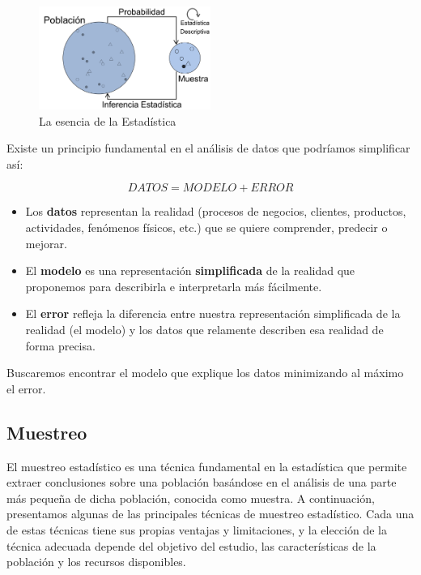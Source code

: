 \documentclass[
  letterpaper,
  DIV=11,
  numbers=noendperiod]{scrreprt}
\begin{document}
\begin{figure}

{\centering \includegraphics[width=0.5\textwidth,height=\textheight]{dogma1.png}

}

\caption{\label{fig-muestreo}La esencia de la Estadística}

\end{figure}

Existe un principio fundamental en el análisis de datos que podríamos
simplificar así:

\[DATOS = MODELO + ERROR\]

\begin{itemize}
\item
  Los \textbf{datos} representan la realidad (procesos de negocios,
  clientes, productos, actividades, fenómenos físicos, etc.) que se
  quiere comprender, predecir o mejorar.
\item
  El \textbf{modelo} es una representación \textbf{simplificada} de la
  realidad que proponemos para describirla e interpretarla más
  fácilmente.
\item
  El \textbf{error} refleja la diferencia entre nuestra representación
  simplificada de la realidad (el modelo) y los datos que relamente
  describen esa realidad de forma precisa.
\end{itemize}

Buscaremos encontrar el modelo que explique los datos minimizando al
máximo el error.

\hypertarget{muestreo}{%
\subsection{Muestreo}\label{muestreo}}

El muestreo estadístico es una técnica fundamental en la estadística que
permite extraer conclusiones sobre una población basándose en el
análisis de una parte más pequeña de dicha población, conocida como
muestra. A continuación, presentamos algunas de las principales técnicas
de muestreo estadístico. Cada una de estas técnicas tiene sus propias
ventajas y limitaciones, y la elección de la técnica adecuada depende
del objetivo del estudio, las características de la población y los
recursos disponibles.
\end{document}
